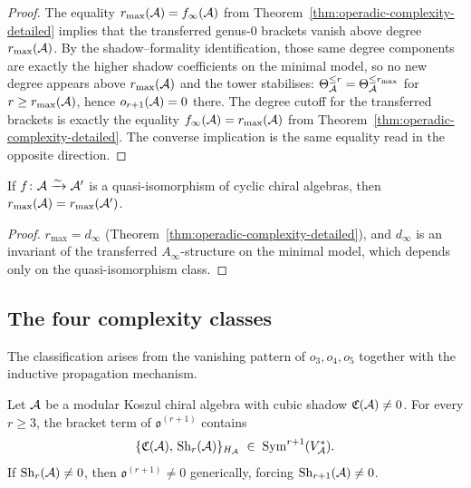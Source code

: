 \begin{proof}
The equality $r_{\max}(\mathcal{A}) = f_\infty(\mathcal{A})$ from
Theorem~\ref{thm:operadic-complexity-detailed} implies that
the transferred genus-$0$ brackets vanish above degree
$r_{\max}(\mathcal{A})$. By the shadow--formality identification,
those same degree components are exactly the higher shadow
coefficients on the minimal model, so no new degree appears above
$r_{\max}(\mathcal{A})$ and the tower stabilises:
$\Theta_{\mathcal{A}}^{\le r} = \Theta_{\mathcal{A}}^{\le r_{\max}}$ for
$r \ge r_{\max}(\mathcal{A})$, hence $o_{r+1}(\mathcal{A})=0$ there. The
degree cutoff for the transferred brackets is exactly the equality
$f_\infty(\mathcal{A}) = r_{\max}(\mathcal{A})$ from
Theorem~\ref{thm:operadic-complexity-detailed}. The converse
implication is the same equality read in the opposite direction.
\end{proof}

\begin{proposition}
\label{prop:thqg-depth-qi-invariant}
\ClaimStatusProvedHere
{}
If $f\colon \mathcal{A} \xrightarrow{\sim} \mathcal{A}'$ is a quasi-isomorphism
of cyclic chiral algebras, then
$r_{\max}(\mathcal{A}) = r_{\max}(\mathcal{A}')$.
\end{proposition}

\begin{proof}
$r_{\max} = d_\infty$
(Theorem~\ref{thm:operadic-complexity-detailed}), and $d_\infty$
is an invariant of the transferred $A_\infty$-structure on the
minimal model, which depends only on the quasi-isomorphism class.
\end{proof}



\subsection{The four complexity classes}
\label{subsec:thqg-four-classes}

The classification arises from the vanishing pattern of
$o_3, o_4, o_5$ together with the inductive propagation mechanism.

\begin{lemma}
\label{lem:thqg-cubic-source}
\ClaimStatusProvedHere
{}
Let $\mathcal{A}$ be a modular Koszul chiral algebra with cubic
shadow $\mathfrak{C}(\mathcal{A}) \neq 0$. For every $r \geq 3$,
the bracket term of $\mathfrak{o}^{(r+1)}$ contains
\begin{equation}\label{eq:thqg-cubic-source-contribution}
\{\mathfrak{C}(\mathcal{A}),\, \mathrm{Sh}_r(\mathcal{A})\}_{H_{\mathcal{A}}}
\;\in\;
\operatorname{Sym}^{r+1}(V_{\mathcal{A}}^*).
\end{equation}
If $\mathrm{Sh}_r(\mathcal{A}) \neq 0$, then
$\mathfrak{o}^{(r+1)} \neq 0$ generically, forcing
$\mathrm{Sh}_{r+1}(\mathcal{A}) \neq 0$.
\end{lemma}

